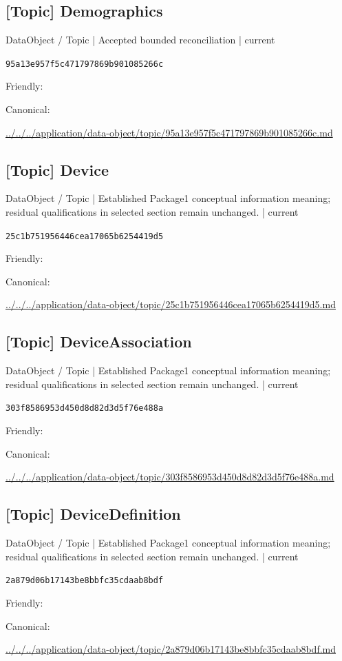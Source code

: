 \documentclass[10pt,a4paper]{article}
\begin{document}
\subsection*{[Topic] Demographics}
{\small DataObject / Topic | Accepted bounded reconciliation | current}\par
\texttt{95a13e957f5c471797869b901085266c}\par
Friendly: \par
Canonical: \par
{\footnotesize\url{../../../application/data-object/topic/95a13e957f5c471797869b901085266c.md}}\par
\subsection*{[Topic] Device}
{\small DataObject / Topic | Established Package1 conceptual information meaning; residual qualifications in selected section remain unchanged. | current}\par
\texttt{25c1b751956446cea17065b6254419d5}\par
Friendly: \par
Canonical: \par
{\footnotesize\url{../../../application/data-object/topic/25c1b751956446cea17065b6254419d5.md}}\par
\subsection*{[Topic] DeviceAssociation}
{\small DataObject / Topic | Established Package1 conceptual information meaning; residual qualifications in selected section remain unchanged. | current}\par
\texttt{303f8586953d450d8d82d3d5f76e488a}\par
Friendly: \par
Canonical: \par
{\footnotesize\url{../../../application/data-object/topic/303f8586953d450d8d82d3d5f76e488a.md}}\par
\subsection*{[Topic] DeviceDefinition}
{\small DataObject / Topic | Established Package1 conceptual information meaning; residual qualifications in selected section remain unchanged. | current}\par
\texttt{2a879d06b17143be8bbfc35cdaab8bdf}\par
Friendly: \par
Canonical: \par
{\footnotesize\url{../../../application/data-object/topic/2a879d06b17143be8bbfc35cdaab8bdf.md}}\par
\end{document}
